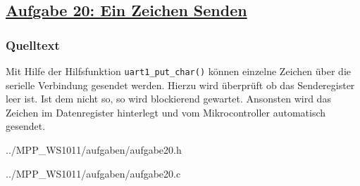 \subsection
{\href{http://cst.mi.fu-berlin.de/intern/19606-P-MPP/Aufgaben/040701.html}
{Aufgabe 20: Ein Zeichen Senden}}

\subsubsection*{Quelltext}
Mit Hilfe der Hilfsfunktion \texttt{uart1\_put\_char()} können einzelne Zeichen über die serielle Verbindung gesendet werden. Hierzu wird überprüft ob das Senderegister leer ist. Ist dem nicht so, so wird blockierend gewartet. Ansonsten wird das Zeichen im Datenregister hinterlegt und vom Mikrocontroller automatisch gesendet.

{../MPP_WS1011/aufgaben/aufgabe20.h}

{../MPP_WS1011/aufgaben/aufgabe20.c}
